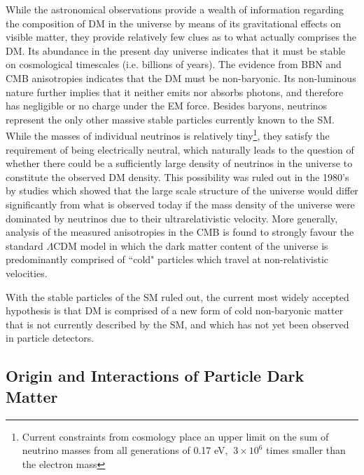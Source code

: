 While the astronomical observations provide a wealth of information regarding the composition of DM in the universe by means of its gravitational effects on visible matter, they provide relatively few clues as to what actually comprises the DM. Its abundance in the present day universe indicates that it must be stable on cosmological timescales (i.e. billions of years). The evidence from BBN and CMB anisotropies indicates that the DM must be non-baryonic. Its non-luminous nature further implies that it neither emits nor absorbs photons, and therefore has negligible or no charge under the EM force. Besides baryons, neutrinos represent the only other massive stable particles currently known to the SM. While the masses of individual neutrinos is relatively tiny\footnote{Current constraints from cosmology place an upper limit on the sum of neutrino masses from all generations of 0.17 eV, \(~3\times10^6\) times smaller than the electron mass}, they satisfy the requirement of being electrically neutral, which naturally leads to the question of whether there could be a sufficiently large density of neutrinos in the universe to constitute the observed DM density. This possibility was ruled out in the 1980's by studies \cite{neutrino_dm} which showed that the large scale structure of the universe would differ significantly from what is observed today if the mass density of the universe were dominated by neutrinos due to their ultrarelativistic velocity. More generally, analysis of the measured anisotropies in the CMB \cite{Planck_2020} is found to strongly favour the standard \(\Lambda\)CDM model in which the dark matter content of the universe is predominantly comprised of ``cold" particles which travel at non-relativistic velocities.

With the stable particles of the SM ruled out, the current most widely accepted hypothesis is that DM is comprised of a new form of cold non-baryonic matter that is not currently described by the SM, and which has not yet been observed in particle detectors.

\subsection{Origin and Interactions of Particle Dark Matter}

